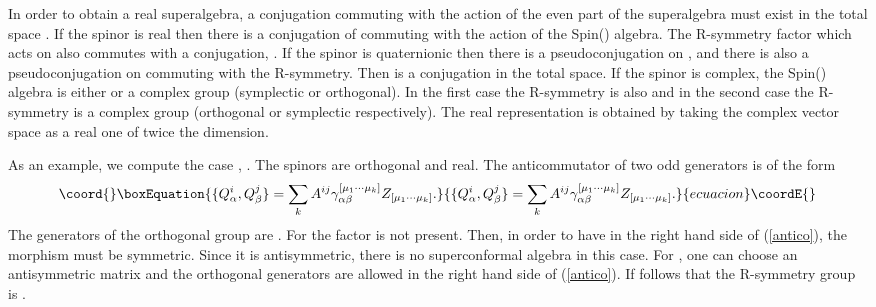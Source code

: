 \documentclass[a4paper,12pt]{article}
\begin{document}
In order to obtain a real superalgebra, a conjugation commuting
with the action of the even part of the superalgebra must exist in
the total space \coordHE{}. If the spinor is real then there is
a conjugation \coordHE{} of \coordHE{} commuting with the action of the
Spin(\coordHE{}) algebra.  The R-symmetry factor which acts on \coordHE{} also
commutes with  a conjugation, \coordHE{}.  If the spinor is
quaternionic then there is a pseudoconjugation \coordHE{} on \coordHE{},
and  there is also a pseudoconjugation on \coordHE{} commuting with the
R-symmetry. Then \coordHE{} is a conjugation in the
total space. If the spinor is complex,  the Spin(\coordHE{}) algebra is
either \coordHE{} or a  complex group (symplectic or
orthogonal). In the first case the R-symmetry is also \coordHE{}
and in the second case the R-symmetry is a complex group
(orthogonal or symplectic respectively). The real representation
is obtained by taking the complex vector space as a real one of
twice the dimension.

As an example, we compute the case \coordHE{}, \coordHE{}. The
spinors are orthogonal and real. The anticommutator of two odd
generators is of the form
\begin{equation}\coord{}\boxEquation{\{Q_\alpha^i,Q_\beta^j\}=\sum_k A^{ij}
\gamma_{\alpha\beta}^{[\mu_1\cdots \mu_k]}Z_{[\mu_1\cdots
\mu_k]}.\label{antico}}{\{Q_\alpha^i,Q_\beta^j\}=\sum_k A^{ij}
\gamma_{\alpha\beta}^{[\mu_1\cdots \mu_k]}Z_{[\mu_1\cdots
\mu_k]}.}{ecuacion}\coordE{}\end{equation}  The generators of the
orthogonal group are \coordHE{}. For \coordHE{} the factor
\coordHE{} is not present. Then, in order to have \coordHE{} in the right hand side of (\ref{antico}), the morphism
\myHighlight{$\gamma^{[\mu_1 \mu_2]}_{\alpha\beta}$}\coordHE{} must be symmetric. Since it
is antisymmetric, there is no superconformal algebra in this case.
For \coordHE{}, one can choose an antisymmetric matrix
\coordHE{} and the orthogonal generators are allowed
in the right hand side of (\ref{antico}). If follows that the
R-symmetry group is \coordHE{}.
\end{document}
